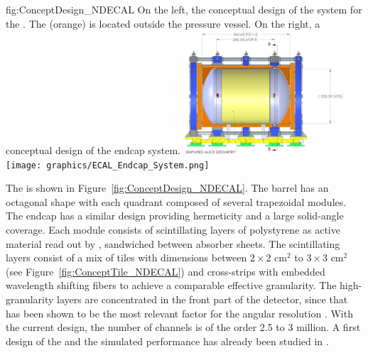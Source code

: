 \begin{dunefigure}{fig:ConceptDesign_NDECAL}
{On the left, the conceptual design of the  system for the . The  (orange) is located outside the  pressure vessel. On the right, a conceptual design of the  endcap system.}
\includegraphics[width=0.45\textwidth]{graphics/MPDdrawing.jpg}
\texttt{[image: graphics/ECAL\_Endcap\_System.png]}
\end{dunefigure}
The  is shown in Figure~\ref{fig:ConceptDesign_NDECAL}.  The barrel has an octagonal shape with each quadrant composed of several trapezoidal modules. The  endcap has a similar design providing hermeticity and a large solid-angle coverage. Each module consists of scintillating layers of polystyrene as active material read out by , sandwiched between absorber sheets. The scintillating layers consist of a mix of tiles with dimensions between $2\times2$ cm$^2$ to $3\times3$ cm$^2$ (see Figure~\ref{fig:ConceptTile_NDECAL}) and cross-strips with embedded wavelength shifting fibers to achieve a comparable effective granularity. The high-granularity layers are concentrated in the front part of the detector, since that has been shown to be the most relevant factor for the angular resolution \cite{Emberger:2018pgr}. With the current design, the number of channels is of the order 2.5 to 3 million. A first design of the  and the simulated performance has already been studied in \cite{Emberger:2018pgr}.

